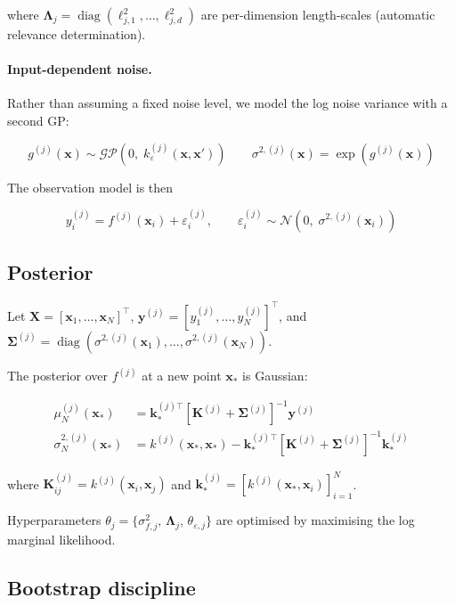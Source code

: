 \documentclass[11pt, letterpaper]{article}
\theoremstyle{definition}
\begin{document}
where $\bm{\Lambda}_j = \operatorname{diag}(\ell_{j,1}^{2}, \ldots, \ell_{j,d}^{2})$
are per-dimension length-scales (automatic relevance determination).

\paragraph{Input-dependent noise.}
Rather than assuming a fixed noise level, we model the log noise variance
with a second GP:

\[
  g^{(j)}(\bm{x}) \sim \mathcal{GP}\!\left(0,\; k_{\varepsilon}^{(j)}(\bm{x},\bm{x}')\right)
  \qquad
  \sigma^{2,(j)}(\bm{x}) = \exp\!\left(g^{(j)}(\bm{x})\right)
\]

The observation model is then

\[
  y_i^{(j)} = f^{(j)}(\bm{x}_i) + \varepsilon_i^{(j)},
  \qquad
  \varepsilon_i^{(j)} \sim \mathcal{N}\!\left(0,\; \sigma^{2,(j)}(\bm{x}_i)\right)
\]

\subsection*{Posterior}

Let $\bm{X} = [\bm{x}_1,\ldots,\bm{x}_N]^{\top}$,
$\bm{y}^{(j)} = [y_1^{(j)},\ldots,y_N^{(j)}]^{\top}$, and
$\bm{\Sigma}^{(j)} = \operatorname{diag}\!\left(\sigma^{2,(j)}(\bm{x}_1),\ldots,\sigma^{2,(j)}(\bm{x}_N)\right)$.

The posterior over $f^{(j)}$ at a new point $\bm{x}_*$ is Gaussian:

\begin{align}
  \mu_N^{(j)}(\bm{x}_*)
    &= \bm{k}_*^{(j)\top}
       \left[\bm{K}^{(j)} + \bm{\Sigma}^{(j)}\right]^{-1}
       \bm{y}^{(j)} \\[4pt]
  \sigma_N^{2,(j)}(\bm{x}_*)
    &= k^{(j)}(\bm{x}_*,\bm{x}_*)
      - \bm{k}_*^{(j)\top}
        \left[\bm{K}^{(j)} + \bm{\Sigma}^{(j)}\right]^{-1}
        \bm{k}_*^{(j)}
\end{align}

where $\bm{K}^{(j)}_{ij} = k^{(j)}(\bm{x}_i, \bm{x}_j)$ and
$\bm{k}_*^{(j)} = [k^{(j)}(\bm{x}_*, \bm{x}_i)]_{i=1}^N$.

Hyperparameters
$\theta_j = \{\sigma_{f,j}^2,\, \bm{\Lambda}_j,\, \theta_{\varepsilon,j}\}$
are optimised by maximising the log marginal likelihood.

\subsection*{Bootstrap discipline}
\end{document}
